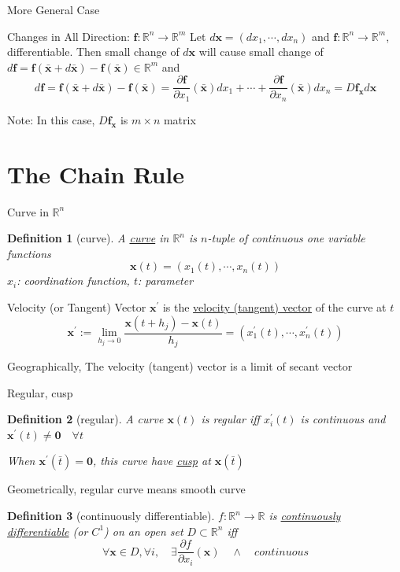 \documentclass[a4paper,11pt]{article}
\newtheorem{defn}{Definition}
\newcommand{\bb}{\mathbb}
\newcommand{\bd}{\mathbf}
\newcommand{\p}{\partial}
\begin{document}
\begin{frame}[t]{More General Case}
	\begin{block}
		{Changes in All Direction: $\bd f:\bb{R}^n\rightarrow \bb{R}^m$}
		Let $d \bd x = (d x_1, \cdots, d x_n)$ and $\bd f:\bb{R}^n\rightarrow\bb{R}^m$, differentiable. Then small change of $d\bd x$ will cause small change of $d\bd f=\bd f(\bar{\bd x} + d \bar{\bd x}) - \bd f(\bar{\bd x})\in\bb{R}^m$ and \[
			d\bd f = \bd f(\bar{\bd x} + d \bar{\bd x}) - \bd f(\bar{\bd x}) = \frac{\p \bd f}{\p x_1}(\bar{\bd x})dx_1 + \cdots +\frac{\p \bd f}{\p x_n}(\bar{\bd x})dx_n= D\bd f_{\bd x} d\bd x
		\]
	\end{block}
	Note: In this case, $D\bd f_{\bd x}$ is $m\times n$ matrix
\end{frame}
\section{The Chain Rule} %
\label{sec:the_chain_rule}
\begin{frame}[t]{Curve in $\bb{R}^n$}
	\begin{defn}
		[curve] A \uline{curve} in $\bb{R}^n$ is $n$-tuple of continuous one variable functions\[
			\bd x(t) = (x_1(t),\cdots,x_n(t))
		\]
		$x_i$: coordination function, $t$: parameter
	\end{defn}
	\begin{block}
		{Velocity (or Tangent) Vector}
		$\bd{x}^\prime$ is the \uline{velocity (tangent) vector} of the curve at $t$\[
			\bd{x}^\prime := \lim_{h_j\rightarrow 0}\frac{\bd{x}(t+h_j)-\bd{x}(t)}{h_j}=(x_1^\prime(t),\cdots,x_n^\prime(t))
		\]
	\end{block}
	Geographically, The velocity (tangent) vector is a limit of secant vector
\end{frame}
\begin{frame}[t]{Regular, cusp}
	\begin{defn}
		[regular] A curve $\bd x(t)$ is regular iff $x_i^\prime(t) $ is continuous and $\bd x^\prime(t)\neq \bd{0}\quad \forall t$
		
		When $\bd x^\prime(\bar t) = \bd{0}$, this curve have \uline{cusp} at $\bd{x}(\bar t)$
	\end{defn}
	Geometrically, regular curve means smooth curve
	
	\begin{defn}
		[continuously differentiable] $f:\bb{R}^n\rightarrow\bb{R}$ is \uline{continuously differentiable} (or $C^1$) on an open set $ D\subset\bb{R}^n$ iff \[
			\forall\bd x\in D, \forall i, \quad \exists \frac{\p f}{\p x_i}(\bd x) \quad\land\quad continuous
		\]
	\end{defn}
\end{frame}
\end{document}
